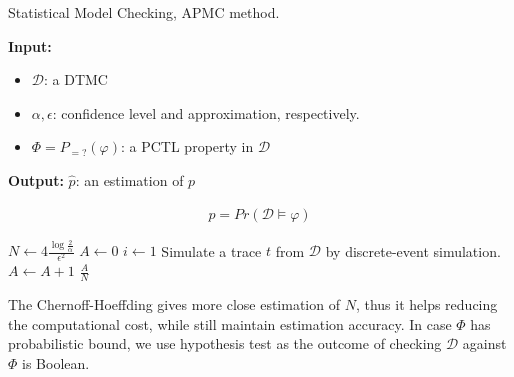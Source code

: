 \begin{algorithm}[H]
      \caption{Statistical Model Checking, APMC method.}
      \label{alg:smc-apmc}
      \footnotesize{
            \hspace*{\algorithmicindent} \textbf{Input:}
            \begin{itemize}
                  \item $\mathcal{D}$: a DTMC
                  \item $\alpha, \epsilon$: confidence level and approximation, respectively.
                  \item $\Phi = P_{=?}(\varphi) $: a PCTL property in $\mathcal{D}$
            \end{itemize}
            \hspace*{\algorithmicindent} \textbf{Output:} $\hat{p}$: an estimation of $p$
      }
      \begin{align*}
            p = Pr(\mathcal{D} \models \varphi)
      \end{align*}
      \begin{algorithmic}[1]
            \State $N \leftarrow 4\frac{\log{\frac{2}{\alpha}}}{\epsilon^2}$
            \State $A \leftarrow 0$
            \State $i \leftarrow 1$
            \State Simulate a trace $t$ from $\mathcal{D}$ by discrete-event simulation.
            \State $A \leftarrow A + 1$
            \EndIf
            \EndWhile
            \Return $\frac{A}{N}$
            \EndProcedure
      \end{algorithmic}
\end{algorithm}
The Chernoff-Hoeffding gives more close estimation of $N$, thus it helps reducing the computational
cost, while still maintain estimation accuracy. In case $\Phi$ has probabilistic bound, we use
hypothesis test as the outcome of checking $\mathcal{D}$ against $\Phi$ is Boolean.


